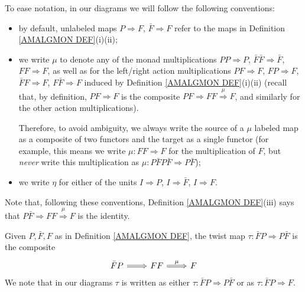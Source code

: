 \documentclass[a4paper,10pt
]{article}%
\renewcommand{\1}{\eta}%
\begin{document}
\begin{remark}\label{SHORTCONV REM}
	To ease notation, in our diagrams we will follow the following conventions:
	\begin{itemize}
		\item by default, unlabeled maps
		$P \Rightarrow F$, $\bar{F} \Rightarrow F$ refer to the maps in
		Definition \ref{AMALGMON DEF}(i)(ii);
		\item we write $\mu$ to denote any of the monad multiplications
		$PP \Rightarrow P$,
		$\bar{F}\bar{F} \Rightarrow \bar{F}$,
		$FF \Rightarrow F$,
		as well as for the left/right action multiplications
		$PF \Rightarrow F$,
		$FP \Rightarrow F$,
		$\bar{F} F \Rightarrow F$,
		$F \bar{F} \Rightarrow F$
		induced by Definition \ref{AMALGMON DEF}(i)(ii)
		(recall that, by definition,
		$PF \Rightarrow F$ is the composite
		$PF \Rightarrow FF \overset{\mu}{\Rightarrow} F$,
		and similarly for the other action multiplications).
		
		Therefore, to avoid ambiguity, we always write the 
		source of a $\mu$ labeled map as a composite of two functors and the target as a single functor
		(for example, this means we write 
		$\mu\colon FF \Rightarrow F$ for the multiplication of $F$,
		but \emph{never} write this multiplication as $\mu \colon P \bar{F} P \bar{F} \Rightarrow P \bar{F}$);
		\item we write $\eta$ for either of the units 
		$I \Rightarrow P$,
		$I \Rightarrow \bar{F}$,
		$I \Rightarrow F$.
	\end{itemize}
	Note that, following these conventions, 
	Definition \ref{AMALGMON DEF}(iii)
	says that 
	$P\bar{F} \Rightarrow FF \overset{\mu}{\Rightarrow} F$
	is the identity.
\end{remark}


\begin{definition}\label{TWISTMAP DEF}
	Given $P,\bar{F},F$ as in Definition \ref{AMALGMON DEF}, 
	the twist map $\tau \colon \bar{F} P \Rightarrow P \bar{F}$ is the composite
	\[
	\begin{tikzcd}
	\bar{F} P \ar[Rightarrow]{r}{}
	&
	FF  \ar[Rightarrow]{r}{\mu}
	&
	F 
	\end{tikzcd}
	\]
	We note that in our diagrams $\tau$ is written as either
	$\tau \colon \bar{F} P \Rightarrow P \bar{F}$ or as
	$\tau \colon \bar{F} P \Rightarrow F$.
\end{definition}
\end{document}
